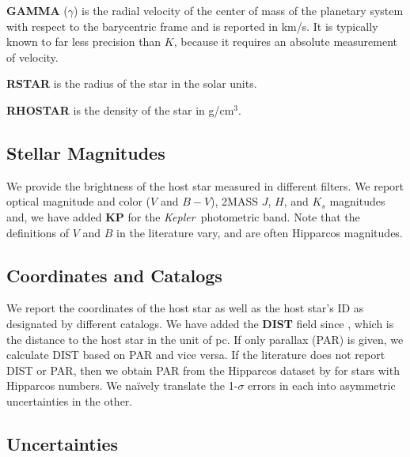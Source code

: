 \documentclass[11pt,preprint]{aastex}
\def\kepler{\textit{Kepler}}
\begin{document}
\begin{CJK*}{UTF8}{gbsn}
{\bf GAMMA} ($\gamma$) is the radial velocity of the center of mass of
the planetary system with respect to the barycentric frame and is
reported in km/s.  It is typically known to far less precision than
$K$, because it requires an absolute measurement of velocity.

{\bf RSTAR} is the radius of the star in the solar units.

{\bf RHOSTAR} is the density of the star in g/cm$^3$.

\subsection{Stellar Magnitudes}\label{sec:stellarmag}

We provide the brightness of the host star measured in different
filters. We report optical magnitude and color ($V$ and $B-V$),
2MASS $J$, $H$, and $K_s$ magnitudes and, we have added {\bf KP} for
the \kepler\ photometric band. Note that the definitions of $V$ and $B$ in the literature vary, and are often Hipparcos magnitudes.


\subsection{Coordinates and Catalogs}\label{sec:coord}

We report the coordinates of the host star as well as the host star's
ID as designated by different catalogs.  We have added the {\bf DIST} field since
\cite{Wright2011}, which is the distance to the host star in the unit
of pc. If only parallax (PAR) is given, we calculate DIST based on PAR
and vice versa. If the literature does not report DIST or PAR, then we
obtain PAR from the Hipparcos dataset by \cite{van Leeuwen2009} for
stars with Hipparcos numbers. We na\"ively translate the 1-$\sigma$ errors in each into asymmetric
uncertainties in the other.

\subsection{Uncertainties}\label{sec:unc}


\end{CJK*}
\end{document}
